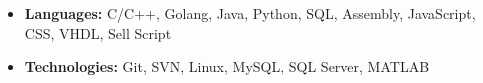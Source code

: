\documentclass[11pt,a4paper,palatine]{moderncv}        %
\begin{document}
\begin{CJK*}{UTF8}{gbsn}

  {\begin{itemize}
    \item  \textbf{Languages: }C/C++, Golang, Java, Python, SQL, Assembly, JavaScript, CSS, VHDL, Sell Script
    \item  \textbf{Technologies: }Git, SVN, Linux, MySQL, SQL Server, MATLAB
  \end{itemize}
}
\end{CJK*}
\end{document}
